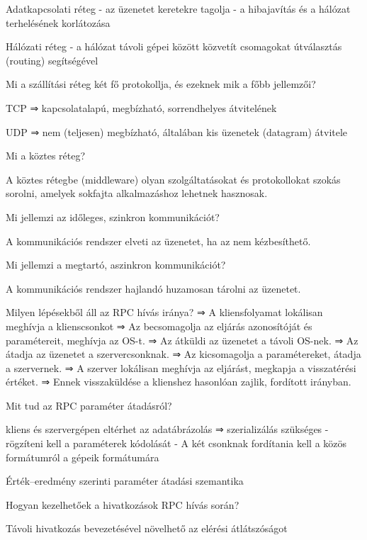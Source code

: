 \documentclass[12pt]{article}
\begin{document}
\begin{description}
    \item Adatkapcsolati réteg
        - az üzenetet keretekre tagolja
        - a hibajavítás és a hálózat terhelésének korlátozása
    \item Hálózati réteg
        - a hálózat távoli gépei között közvetít csomagokat útválasztás (routing) segítségével
    \item  Mi a szállítási réteg két fő protokollja, és ezeknek mik a főbb jellemzői?
    \item TCP ⇒ kapcsolatalapú, megbízható, sorrendhelyes átvitelének
    \item UDP ⇒ nem (teljesen) megbízható, általában kis üzenetek (datagram) átvitele	
    \item  Mi a köztes réteg?
    \item A köztes rétegbe (middleware) olyan szolgáltatásokat és protokollokat szokás sorolni, amelyek sokfajta alkalmazáshoz lehetnek hasznosak.
    \item  Mi jellemzi az időleges, szinkron kommunikációt?
    \item A kommunikációs rendszer elveti az üzenetet, ha az nem kézbesíthető.
    \item  Mi jellemzi a megtartó, aszinkron kommunikációt?
    \item A kommunikációs rendszer hajlandó huzamosan tárolni az üzenetet.
    \item  Milyen lépésekből áll az RPC hívás iránya?
        ⇒ A kliensfolyamat lokálisan meghívja a klienscsonkot
        ⇒ Az becsomagolja az eljárás azonosítóját és paramétereit, meghívja az OS-t.
        ⇒ Az átküldi az üzenetet a távoli OS-nek.
        ⇒ Az átadja az üzenetet a szervercsonknak.
        ⇒ Az kicsomagolja a paramétereket, átadja a szervernek.
        ⇒ A szerver lokálisan meghívja az eljárást, megkapja a visszatérési értéket.
        ⇒ Ennek visszaküldése a klienshez hasonlóan zajlik, fordított irányban.
    \item  Mit tud az RPC paraméter átadásról?
    \item kliens és szervergépen eltérhet az adatábrázolás ⇒ szerializálás szükséges
        - rögzíteni kell a paraméterek kódolását
        - A két csonknak fordítania kell a közös formátumról a gépeik formátumára
    \item Érték–eredmény szerinti paraméter átadási szemantika
    \item  Hogyan kezelhetőek a hivatkozások RPC hívás során?
    \item Távoli hivatkozás bevezetésével növelhető az elérési átlátszóságot

\end{description}
\end{document}
